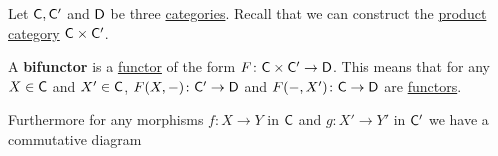 \documentclass[../../main]{subfiles}
\begin{document}
\begin{example}[Bifunctor] \label{ex:bifunctor}
  Let \(\mathsf{C}, \mathsf{C}'\) and \(\mathsf{D}\) be three \hyperref[def:category]{categories}.
  Recall that we can construct the \hyperref[def:product-category]{product category} \(\mathsf{C} \times \mathsf{C}'\).

  A \textbf{bifunctor} is a \hyperref[def:functor]{functor} of the form \(F\colon \mathsf{C} \times \mathsf{C}' \to \mathsf{D}\).
  This means that for any \(X \in \mathsf{C}\) and \(X' \in \mathsf{C}\), \(F(X, -)\colon \mathsf{C}' \to \mathsf{D}\) and \(F(-, X')\colon \mathsf{C} \to \mathsf{D}\) are \hyperref[def:functor]{functors}.

  Furthermore for any morphisms \(f\colon X \to Y\) in \(\mathsf{C}\) and \(g\colon X' \to Y'\) in \(\mathsf{C}'\) we have a commutative diagram
  \begin{center}
  \end{center}
\end{example}
\end{document}
